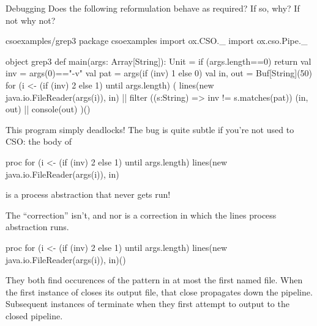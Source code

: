 \documentclass{concdistfoils}
\begin{document}
\begin{slide}
\begin{ex**}{Debugging}
Does the following reformulation behave as required? If so, why? If not
why not?
\begin{obj*}{csoexamples/grep3}
package csoexamples
import  ox.CSO._
import  ox.cso.Pipe._

object grep3
{ def main(args: Array[String]): Unit = 
  { if (args.length==0) return
    val inv = args(0)=="-v"
    val pat = args(if (inv) 1 else 0)
    val in, out  = Buf[String](50) 
    for (i <- (if (inv) 2 else 1) until args.length)     
      (  lines(new java.io.FileReader(args(i)), in)
      || filter ((s:String) => inv != s.matches(pat)) (in, out) 
      || console(out) 
      )()
  }
}
\end{obj*}

\begin{ans}
This program simply deadlocks! The bug is quite subtle if you're not used to CSO: the
body of 
\begin{scala}
 proc { for (i <- (if (inv) 2 else 1) until args.length) 
                lines(new java.io.FileReader(args(i)), in) }
\end{scala}
is a process abstraction that never gets run! 

The ``correction'' isn't, and nor is a correction in which
the lines process abstraction runs.
\begin{scala}
 proc { for (i <- (if (inv) 2 else 1) until args.length) 
                lines(new java.io.FileReader(args(i)), in)() }
\end{scala}

They both find occurences of the pattern in at most the first named file. 
When the first instance of  closes its output file, that
close propagates down the pipeline. Subsequent instances of 
terminate when they first attempt to output to the closed pipeline.

\end{ans}
\end{ex**}
\end{slide}
\end{document}
